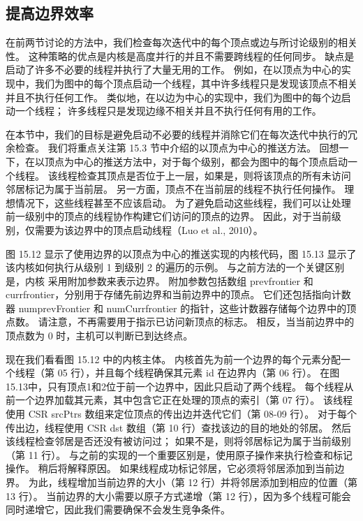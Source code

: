 \subsection{提高边界效率}
在前两节讨论的方法中，我们检查每次迭代中的每个顶点或边与所讨论级别的相关性。 
这种策略的优点是内核是高度并行的并且不需要跨线程的任何同步。 缺点是启动了许多不必要的线程并执行了大量无用的工作。 
例如，在以顶点为中心的实现中，我们为图中的每个顶点启动一个线程，其中许多线程只是发现该顶点不相关并且不执行任何工作。 
类似地，在以边为中心的实现中，我们为图中的每个边启动一个线程； 许多线程只是发现边缘不相关并且不执行任何有用的工作。

在本节中，我们的目标是避免启动不必要的线程并消除它们在每次迭代中执行的冗余检查。 
我们将重点关注第 15.3 节中介绍的以顶点为中心的推送方法。 
回想一下，在以顶点为中心的推送方法中，对于每个级别，都会为图中的每个顶点启动一个线程。 
该线程检查其顶点是否位于上一层，如果是，则将该顶点的所有未访问邻居标记为属于当前层。 
另一方面，顶点不在当前层的线程不执行任何操作。 理想情况下，这些线程甚至不应该启动。 
为了避免启动这些线程，我们可以让处理前一级别中的顶点的线程协作构建它们访问的顶点的边界。 
因此，对于当前级别，仅需要为该边界中的顶点启动线程（Luo et al., 2010）。

图 15.12 显示了使用边界的以顶点为中心的推送实现的内核代码，图 15.13 显示了该内核如何执行从级别 1 到级别 2 的遍历的示例。
与之前方法的一个关键区别是，内核 采用附加参数来表示边界。 
附加参数包括数组 prevfrontier 和 currfrontier，分别用于存储先前边界和当前边界中的顶点。 
它们还包括指向计数器 numprevFrontier 和 numCurrfrontier 的指针，这些计数器存储每个边界中的顶点数。 
请注意，不再需要用于指示已访问新顶点的标志。 相反，当当前边界中的顶点数为 0 时，主机可以判断已到达终点。

现在我们看看图 15.12 中的内核主体。 
内核首先为前一个边界的每个元素分配一个线程（第 05 行），并且每个线程确保其元素 id 在边界内（第 06 行）。 
在图15.13中，只有顶点1和2位于前一个边界中，因此只启动了两个线程。 
每个线程从前一个边界加载其元素，其中包含它正在处理的顶点的索引（第 07 行）。 
该线程使用 CSR srcPtrs 数组来定位顶点的传出边并迭代它们（第 08-09 行）。 
对于每个传出边，线程使用 CSR dst 数组（第 10 行）查找该边的目的地处的邻居。 然后该线程检查邻居是否还没有被访问过； 
如果不是，则将邻居标记为属于当前级别（第 11 行）。 与之前的实现的一个重要区别是，使用原子操作来执行检查和标记操作。 
稍后将解释原因。 如果线程成功标记邻居，它必须将邻居添加到当前边界。 
为此，线程增加当前边界的大小（第 12 行）并将邻居添加到相应的位置（第 13 行）。 
当前边界的大小需要以原子方式递增（第 12 行），因为多个线程可能会同时递增它，因此我们需要确保不会发生竞争条件。

